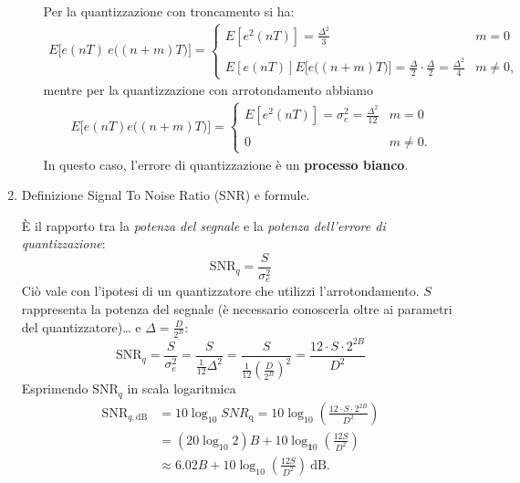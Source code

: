 \documentclass[
]{article}
\begin{document}
\begin{enumerate}
\begin{enumerate}
    Per la quantizzazione con troncamento si ha: \begin{align*}
    E\Big[e(nT)\ e\Big((n+m)T\Big)\Big]=\left\{\begin{array}{ll}E[e^2(nT)]=\frac{\Delta^2}{3}&m=0\\
    \\E[e(nT)]E\Big[e\Big((n+m)T\Big)\Big]=\frac{\Delta}{2}\cdot\frac{\Delta}{2} =\frac{\Delta^2}{4}&m\neq0,\end{array}\right.
    \end{align*} mentre per la quantizzazione con arrotondamento abbiamo
    \begin{align*}
    E\Big[e(nT)e\Big((n+m)T\Big)\Big]=\left\{\begin{array}{ll}E[e^2(nT)]=\sigma_e^2=\frac{\Delta^2}{12}&m=0\\\\0&m\ne0.\end{array}\right.
    \end{align*} In questo caso, l'errore di quantizzazione è un
    \textbf{processo bianco}.
  \end{enumerate}
\item
  Definizione Signal To Noise Ratio (SNR) e formule.

  È il rapporto tra la \emph{potenza del segnale} e la \emph{potenza
  dell'errore di quantizzazione}: \[
  \text{SNR}_q = \frac{S}{\sigma^2_e}
  \] Ciò vale con l'ipotesi di un quantizzatore che utilizzi
  l'arrotondamento. \(S\) rappresenta la potenza del segnale (è
  necessario conoscerla oltre ai parametri del quantizzatore)\ldots{} e
  \(\Delta=\frac{D}{2^{B}}\): \[
  \text{SNR}_{q}=\frac{S}{\sigma_e^2}=\frac{S}{\frac{1}{12}\Delta^2}=\frac{S}{\frac{1}{12}(\frac{D}{2^B})^2}=\frac{12\cdot S\cdot2^{2B}}{D^2}
  \] Esprimendo \(\text{SNR}_{q}\) in scala logaritmica \begin{align*}
  \text{SNR}_{q, \text{dB}} &=10\log_{10}SNR_{\mathrm{q}}=10\log_{10}\left(\frac{12\cdot S\cdot2^{2B}}{D^{2}}\right) \\
  &=(20 \log_{10}2)B+10\log_{\mathbf{1}0}\left(\frac{12S}{D^2}\right) \\
  &\approx6.02B+10\log_{10}\left(\frac{12S}{D^2}\right)\ \mathrm{dB}. 
  \end{align*}
\end{enumerate}
\end{document}

